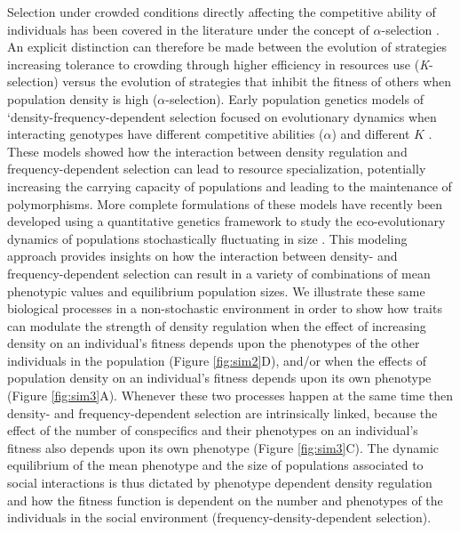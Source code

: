\documentclass{article}
\begin{document}
  Selection under crowded conditions directly affecting the competitive ability of individuals has been covered in the literature under the concept of ${\alpha}$-selection \citep{Joshi2001}. An explicit distinction can therefore be made between the evolution of strategies increasing tolerance to crowding through higher efficiency in resources use (\textit{K}-selection) versus the evolution of strategies that inhibit the fitness of others when population density is high (${\alpha}$-selection). Early population genetics models of `density-frequency-dependent selection focused on evolutionary dynamics when interacting genotypes have different competitive abilities ($\alpha$) and different $K$ \citep{Clarke1972, Anderson1983}. These models showed how the interaction between density regulation and frequency-dependent selection can lead to resource specialization, potentially increasing the carrying capacity of populations and leading to the maintenance of polymorphisms. More complete formulations of these models have recently been developed using a quantitative genetics framework to study the eco-evolutionary dynamics of populations stochastically fluctuating in size \citep{Lande2007, Engen2020}. This modeling approach provides insights on how the interaction between density- and frequency-dependent selection can result in a variety of combinations of mean phenotypic values and equilibrium population sizes. We illustrate these same biological processes in a non-stochastic environment in order to show how traits can modulate the strength of density regulation when the effect of increasing density on an individual's fitness depends upon the phenotypes of the other individuals in the population (Figure \ref{fig:sim2}D), and/or when the effects of population density on an individual's fitness depends upon its own phenotype (Figure \ref{fig:sim3}A). Whenever these two processes happen at the same time then density- and frequency-dependent selection are intrinsically linked, because the effect of the number of conspecifics and their phenotypes on an individual's fitness also depends upon its own phenotype (Figure \ref{fig:sim3}C). The dynamic equilibrium of the mean phenotype and the size of populations associated to social interactions is thus dictated by phenotype dependent density regulation and how the fitness function is dependent on the number and phenotypes of the individuals in the social environment (frequency-density-dependent selection).  
\end{document}
